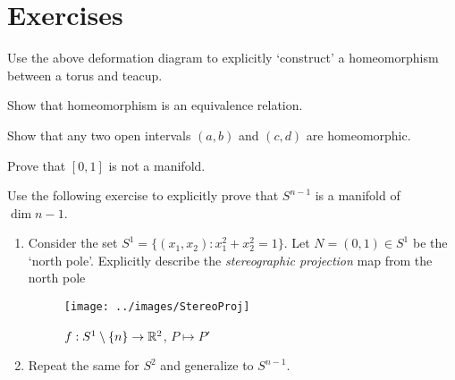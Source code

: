 	\section{Exercises}

	\begin{exercise}
		Use the above deformation diagram to explicitly `construct' a homeomorphism between a torus and teacup.
	\end{exercise}

	\begin{exercise}
		Show that homeomorphism is an equivalence relation.
	\end{exercise}

	\begin{exercise}
		Show that any two open intervals $(a,b)$ and $(c,d)$ are homeomorphic.
	\end{exercise}

	\begin{exercise}
		Prove that $[0,1]$ is not a manifold.
	\end{exercise}


	\begin{exercise}
		Use the following exercise to explicitly prove that $S^{n-1}$ is a manifold of $\dim n-1$.
		\begin{enumerate}
			\item Consider the set $S^1 = \{ (x_1,x_2) : x_1^2 + x_2^2 = 1\}$. Let $N = (0,1) \in S^1$ be the `north pole'. Explicitly describe the \emph{stereographic projection} map from the north pole
			      \begin{figure}[H]
			      	\centering
			      	\texttt{[image: ../images/StereoProj]}
			      	\caption{$f:S^1 \setminus \{n\} \rightarrow \mathbb{R}^2$, $P \mapsto P'$}
			      \end{figure}
			\item Repeat the same for $S^2$ and generalize to $S^{n-1}$.
		\end{enumerate}
	\end{exercise}




